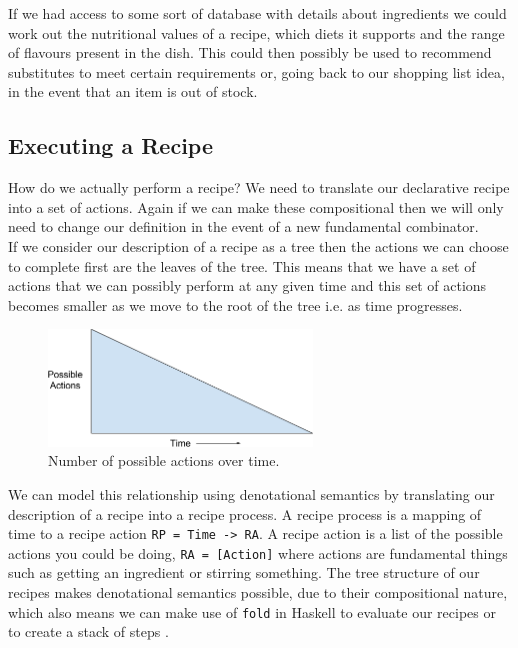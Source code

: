 \documentclass[11pt]{article}
\begin{document}
    If we had access to some sort of database with details about ingredients we could
    work out the nutritional values of a recipe, which diets it supports and the range
    of flavours present in the dish. This could then possibly be used to recommend
    substitutes to meet certain requirements or, going back to our shopping list idea,
    in the event that an item is out of stock. \\

    \subsection{Executing a Recipe}

    How do we actually perform a recipe? We need to translate our declarative
    recipe into a set of actions. Again if we can make these compositional
    then we will only need to change our definition in the event of a
    new fundamental combinator. \\
    
    If we consider our description of a recipe as a tree then the actions
    we can choose to complete first are the leaves of the tree. This means
    that we have a set of actions that we can possibly perform at any given
    time and this set of actions becomes smaller as we move to the root of
    the tree i.e. as time progresses. \\

    \begin{figure}[ht]
        \centering
            \includegraphics[width=7cm,keepaspectratio]{actions_time.png}
        \caption{Number of possible actions over time.}
    \end{figure}
    
    We can model this relationship using denotational semantics by translating
    our description of a recipe into a recipe process. A recipe process is a
    mapping of time to a recipe action \texttt{RP = Time -> RA}. A recipe action
    is a list of the possible actions you could be doing, \texttt{RA = [Action]}
    where actions are fundamental things such as getting an ingredient or stirring
    something. The tree structure of our recipes makes denotational semantics possible,
    due to their compositional nature, which also means we can make use of \texttt{fold}
    in Haskell to evaluate our recipes or to create a stack of steps \cite{hutton-fold}. \\
    
\end{document}
